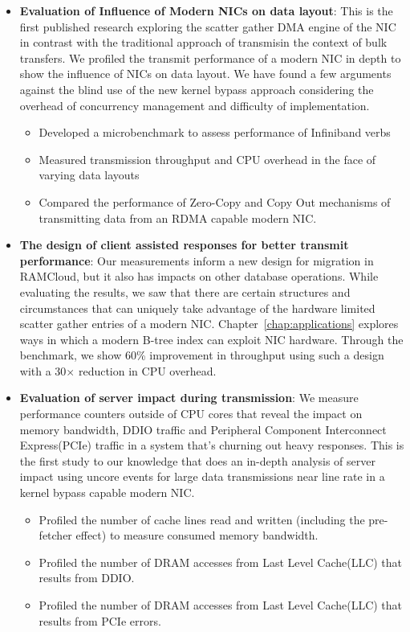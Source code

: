 \begin{itemize}

  \item{\textbf{Evaluation of Influence of Modern NICs on data layout}}: This is the first published research exploring the scatter gather DMA engine of the NIC in contrast with the traditional approach of transmisin the context of bulk transfers. 
   We profiled the transmit performance of a modern NIC in depth to show the influence of NICs on data layout. 
   We have found a few arguments against the blind use of the new kernel bypass approach considering
   the overhead of concurrency management and difficulty of implementation.
   \begin{itemize}

    \item Developed a microbenchmark to assess performance of Infiniband verbs

    \item Measured transmission throughput and CPU overhead in the face of varying
    data layouts

    \item Compared the performance of Zero-Copy and Copy Out mechanisms of 
    transmitting data from an RDMA capable modern NIC.
   \end{itemize} 

    \item{\textbf{The design of client assisted responses for better transmit performance}}: Our measurements inform a new design for migration in RAMCloud, but it also has impacts on other database operations.
     While evaluating the results, we saw that there are certain structures and circumstances that can uniquely take advantage of the hardware limited scatter gather entries of a modern NIC.
     Chapter~\ref{chap:applications} explores ways in which a modern B-tree index can exploit NIC hardware.
     Through the benchmark, we show 60\% improvement in throughput using such a design with a 30$\times$ reduction in CPU overhead.


    \item{\textbf{Evaluation of server impact during transmission}}: We measure performance counters outside of CPU cores that reveal the impact on memory bandwidth,
     DDIO traffic and Peripheral Component Interconnect Express(PCIe) traffic in a system that's churning out heavy responses. This is the first study to our knowledge that does an 
     in-depth analysis of server impact using uncore events for large data transmissions near line rate in a kernel bypass capable modern NIC.
     \begin{itemize}
     \item Profiled the number of cache lines read and written (including the pre-fetcher effect) to measure consumed memory bandwidth.
     \item Profiled the number of DRAM accesses from Last Level Cache(LLC) that results from DDIO.
     \item Profiled the number of DRAM accesses from Last Level Cache(LLC) that results from PCIe errors.
     \end{itemize}



\end{itemize}
